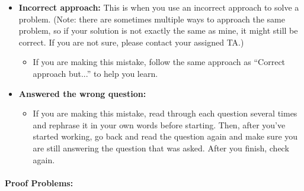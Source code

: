 \documentclass[12pt]{article}
\theoremstyle{definition}
\begin{document}
\begin{itemize}
\begin{itemize}
\end{itemize}
\item \textbf{Incorrect approach:} This is when you use an incorrect approach to solve a problem. (Note: there are sometimes multiple ways to approach the same problem, so if your solution is not exactly the same as mine, it might still be correct. If you are not sure, please contact your assigned TA.)
\begin{itemize}
 \item If you are making this mistake, follow the same approach as ``Correct approach but...'' to help you learn.
 \end{itemize} 
\item \textbf{Answered the wrong question:} 
\begin{itemize}
\item If you are making this mistake, read through each question several times and rephrase it in your own words before starting. Then, after you've started working, go back and read the question again and make sure you are still answering the question that was asked. After you finish, check again.
\end{itemize}
\end{itemize}


\paragraph{{\Large{Proof Problems:}}}
\end{document}
